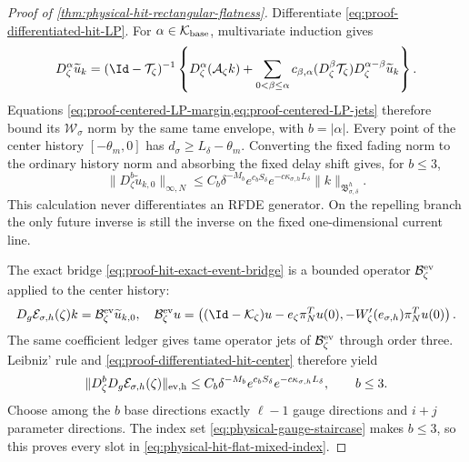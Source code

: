 \begin{proof}[Proof of
\cref{thm:physical-hit-rectangular-flatness}]
Differentiate \cref{eq:proof-differentiated-hit-LP}.  For
$\alpha\in\mathcal K_{\rm base}$, multivariate induction gives
\begin{equation}
 D_\zeta^\alpha\widetilde u_k
 =(\Id-\mathcal T_\zeta)^{-1}
 \left\{D_\zeta^\alpha(\mathcal A_\zeta k)
 +\sum_{0<\beta\le\alpha}c_{\beta,\alpha}
       (D_\zeta^\beta\mathcal T_\zeta)
       D_\zeta^{\alpha-\beta}\widetilde u_k\right\}. \label{eq:proof-centered-LP-induction}
\end{equation}
Equations
\cref{eq:proof-centered-LP-margin,eq:proof-centered-LP-jets} therefore
bound its $\mathcal W_\sigma$ norm by the same tame envelope, with
$b=|\alpha|$.  Every point
of the center history $[-\theta_m,0]$ has
$d_\sigma\ge L_\delta-\theta_m$.  Converting the fixed fading norm to the
ordinary history norm and absorbing the fixed delay shift gives, for
$b\le3$,
\begin{equation}
 \|D_\zeta^b\widetilde u_{k,0}\|_{\infty,N}
 \le C_b\delta^{-M_b}e^{c_bS_\delta}
       e^{-c\kappa_{\sigma,h}L_\delta}
       \|k\|_{\mathfrak B_{\sigma,\delta}^h}.    \label{eq:proof-differentiated-hit-center}
\end{equation}
This calculation never differentiates an RFDE generator.  On the
repelling branch the only future inverse is still the inverse on the fixed
one-dimensional current line.

The exact bridge \cref{eq:proof-hit-exact-event-bridge} is a bounded
operator $\mathcal B_\zeta^{\rm ev}$ applied to the center history:
\begin{equation}
 D_g\mathcal E_{\sigma,h}(\zeta)k
 =\mathcal B_\zeta^{\rm ev}\widetilde u_{k,0},
 \quad
 \mathcal B_\zeta^{\rm ev}u
 =\left((\Id-\mathcal K_\zeta)u
          -e_\zeta\pi_N^Tu(0),
        -W_\zeta'(e_{\sigma,h})\pi_N^Tu(0)\right).
                                                               \label{eq:proof-centered-event-bridge}
\end{equation}
The same coefficient ledger gives tame operator jets of
$\mathcal B_\zeta^{\rm ev}$ through order three.  Leibniz' rule and
\cref{eq:proof-differentiated-hit-center} therefore yield
\begin{equation}
 \|D_\zeta^bD_g\mathcal E_{\sigma,h}(\zeta)\|_{\rm ev,h}
 \le C_b\delta^{-M_b}e^{c_bS_\delta}
       e^{-c\kappa_{\sigma,h}L_\delta},
 \qquad b\le3.                                  \label{eq:proof-differentiated-hit-event}
\end{equation}
Choose among the $b$ base directions exactly $\ell-1$ gauge directions
and $i+j$ parameter directions.  The index set
\cref{eq:physical-gauge-staircase} makes $b\le3$, so this proves every
slot in \cref{eq:physical-hit-flat-mixed-index}.


\end{proof}

